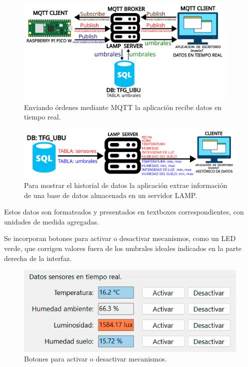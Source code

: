 \begin{figure}[h]
    \centering
    \includegraphics[width=0.95\textwidth]{img/diagramas/mqtt_InverIoT_TiempoReal.png}
    \caption{Enviando órdenes mediante MQTT la aplicación recibe datos en tiempo real.}
\end{figure}

\begin{figure}[h]
    \centering
    \includegraphics[width=1\textwidth]{img/diagramas/mqtt_InverIoT_Historico.png}
    \caption{Para mostrar el historial de datos la aplicación extrae información de una base de datos almacenada en un servidor LAMP.}
\end{figure}


Estos datos son formateados y presentados en textboxes correspondientes, con unidades de medida agregadas.

Se incorporan botones para activar o desactivar mecanismos, como un LED verde, que corrigen valores fuera de los umbrales ideales indicados en la parte derecha de la interfaz.

\begin{figure}[h]
    \centering
    \includegraphics[width=1\textwidth]{img/desarrollo/InverIoT_Desktop_botones_control.png}
    \caption{Botones para activar o desactivar mecanismos.}
\end{figure}

